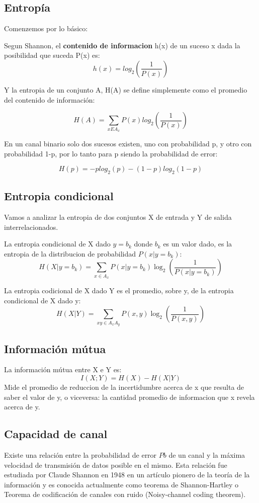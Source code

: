 \subsection{Entropía}

Comenzemos por lo básico:

Segun Shannon, el \textbf{contenido de informacion} h(x) de un suceso x dada la posibilidad que suceda P(x) es:
$$ h(x) = log_{2}\left(\frac{1}{P(x)}\right) $$

Y la entropia de un conjunto A, H(A) se define simplemente como el promedio del contenido de información:

$$ H(A) = \sum_{x E A_{x}} P(x)log_{2}\left(\frac{1}{P(x)}\right)$$

En un canal binario solo dos sucesos existen, uno con probabilidad p, y otro con probabilidad 1-p, por lo tanto para p siendo la probabilidad de error:

$$ H(p) = -p log_{2}(p)-(1-p)log_{2}(1-p) $$

\subsection{Entropia condicional}

Vamos a analizar la entropia de dos conjuntos X de entrada y Y de salida interrelacionados.

La entropia condicional de X dado $y=b_k$ donde $b_k$ es un valor dado, es la entropia de la distribucion de probabilidad $P(x|y=b_{k})$:
$$H(X|y=b_{k}) = \sum_{x \in A_{x}} P(x | y=b_{k})\log_2\left(\frac{1}{P(x | y=b_{k})}\right) $$

La entropia codicional de X dado Y es el promedio, sobre y, de la entropia condicional de X dado y:
$$H(X|Y) =  \sum_{xy \in A_{x}A_{y}} P(x,y)\log_2\left(\frac{1}{P(x,y)}\right) $$

\subsection{Información mútua}
La información mútua entre X e Y es:
$$I(X;Y) = H(X)-H(X|Y)$$
Mide el promedio de reduccion de la incertidumbre acerca de x que resulta de saber el valor de y, o viceversa: la cantidad promedio de informacion que x revela acerca de y.

\fi
\subsection{Capacidad de canal}

Existe una relación entre la probabilidad de error $Pb$ de un canal y la máxima velocidad de transmisión de datos posible en el mismo.
Esta relación fue estudiada por Claude Shannon en 1948 en un artículo pionero de la teoría de la información \cite{shannon48} y es conocida actualmente como teorema de Shannon-Hartley o Teorema de codificación de canales con ruido (Noisy-channel coding theorem).

